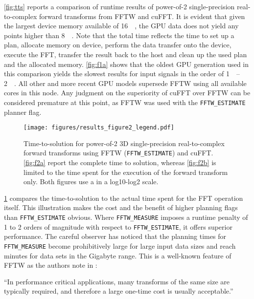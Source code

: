 \cref{fig:tts} reports a comparison of runtime results of power-of-2 single-precision real-to-complex forward transforms from FFTW and cuFFT. It is evident that given the largest device memory available of  \SI{16}{\gibi\byte}, the GPU data does not yield any points higher than \SI{8}{\gibi\byte}. Note that the total time reflects the time to set up a plan, allocate memory on device, perform the data transfer onto the device, execute the FFT, transfer the result back to the host and clean up the used plan and the allocated memory. \cref{fig:f1a} shows that the oldest GPU generation used in this comparison yields the slowest results for input signals in the order of \SIrange{1}{2}{\gibi\byte}. All other and more recent GPU models supersede FFTW using all available cores in this node. Any judgment on the superiority of cuFFT over FFTW can be considered premature at this point, as FFTW was used with the \texttt{FFTW\_ESTIMATE} planner flag.

\begin{figure}[!tbp]
  \centering
  \texttt{[image: figures/results\_figure2\_legend.pdf]}
  \hfill
  \caption{Time-to-solution for power-of-2 3D single-precision real-to-complex forward transforms using FFTW (\texttt{FFTW\_ESTIMATE}) and cuFFT. \cref{fig:f2a} report the complete time to solution, whereas \cref{fig:f2b} is limited to the time spent for the execution of the forward transform only. Both figures use a in a log10-log2 scale.}
  \label{fig:fftw_plan_flags}
\end{figure}

\cref{fig:fftw_plan_flags} compares the time-to-solution to the actual time spent for the FFT operation itself. This illustration makes the cost and the benefit of higher planning flags than \texttt{FFTW\_ESTIMATE} obvious. Where \texttt{FFTW\_MEASURE} imposes a runtime penalty of 1 to 2 orders of magnitude with respect to \texttt{FFTW\_ESTIMATE}, it offers superior performance. The careful observer has noticed that the planning times for \texttt{FFTW\_MEASURE} become prohibitively large for large input data sizes and reach minutes for data sets in the Gigabyte range. This is a well-known feature of FFTW as the authors note in \cite{FFTW05}:

\begin{center}
  ``In performance critical applications, many transforms of the same
  size are typically required, and therefore a large one-time cost is
  usually acceptable.''
\end{center}
 
